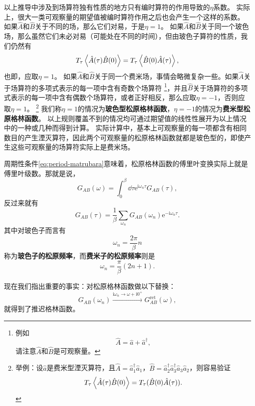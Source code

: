 \documentclass[hyperref, UTF8, a4paper]{ctexart}
\newcommand*{\ii}{\mathrm{i}}
\newcommand*{\ee}{\mathrm{e}}
\begin{document}
以上推导中涉及到场算符独有性质的地方只有编时算符的作用导致的$\eta$系数。
实际上，很大一类可观察量的期望值被编时算符作用之后也会产生一个这样的系数。
如果$\hat{A}$和$\hat{B}$关于不同的场，那么它们对易，于是$\eta=1$。
如果$\hat{A}$和$\hat{B}$关于同一个玻色场，那么虽然它们未必对易（可能处在不同的时间），但由玻色子算符的性质，我们仍然有
\[
    T_\tau \expval{\hat{A}(\tau)\hat{B}(0)} = T_\tau \expval{\hat{B}(0)\hat{A}(\tau)},
\]
也即，应取$\eta=1$。
如果$\hat{A}$和$\hat{B}$关于同一个费米场，事情会略微复杂一些。如果$\hat{A}$关于场算符的多项式表示的每一项中含有奇数个场算符%
\footnote{例如
\[
    \hat{A} = \hat{a}+\hat{a}^\dagger,
\]
请注意$\hat{A}$和$\hat{B}$是可观察量。}，并且$\hat{B}$关于场算符的多项式表示的每一项中含有偶数个场算符，或者正好相反，那么应取$\eta=-1$，否则应取$\eta=1$。%
\footnote{举例：设$\hat{a}$是费米型湮灭算符，且$\hat{A}=\hat{a}_1^\dagger \hat{a}_1$，$\hat{B}=\hat{a}_2^\dagger \hat{a}_3^\dagger \hat{a}_3 \hat{a}_2$，则容易验证
\[
    T_\tau \expval{\hat{A}(\tau)\hat{B}(0)} = T_\tau (\hat{B}(0) \hat{A}(\tau)).
\]
}%
我们称$\eta=1$的情况为\textbf{玻色型松原格林函数}，$\eta=-1$的情况为\textbf{费米型松原格林函数}。
以上规则覆盖不到的情况均可通过期望值的线性性展开为以上情况中的一种或几种而得到计算。
实际计算中，基本上可观察量的每一项都含有相同数目的产生湮灭算符，因此两个可观察量的松原格林函数就都是玻色型的，即使产生这些可观察量的场算符实际上是费米场。

周期性条件\eqref{eq:period-matrubara}意味着，松原格林函数的傅里叶变换实际上就是傅里叶级数。那就是说，
\begin{equation}
    G_{AB}(\omega) = \int_0^\beta \dd{\tau} \ee^{\ii \omega_n \tau} G_{AB}(\tau),
\end{equation}
反过来就有
\begin{equation}
    G_{AB}(\tau) = \frac{1}{\beta} \sum_{\omega_n} G_{AB}(\omega_n) \ee^{- \ii \omega_n \tau}.
\end{equation}
其中对玻色子而言有
\begin{equation}
    \omega_n = \frac{2\pi}{\beta} n
\end{equation}
称为\textbf{玻色子的松原频率}，而\textbf{费米子的松原频率}则是
\begin{equation}
    \omega_n = \frac{\pi}{\beta} (2n+1).
\end{equation}

现在我们指出重要的事实：对松原格林函数做以下替换：
\begin{equation}
    G_{AB}(\omega_n) \xrightarrow{\ii \omega_n \longrightarrow \omega+\ii 0^+} G_{AB}^\text{ret} (\omega),
\end{equation}
就得到了推迟格林函数。
\end{document}
